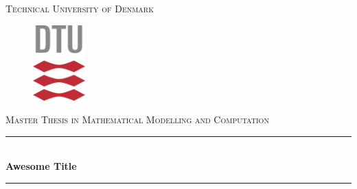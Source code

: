\begin{titlepage}

\newcommand{\HRule}{\rule{\linewidth}{0.5mm}} %

\center %
 



\textsc{\LARGE Technical University of Denmark}\\[0.5cm] %

\begin{figure}[h]
\begin{center}
\includegraphics[width=2cm]{Pics/frontpage/dtu_logo.png}
\end{center}
\end{figure}

\textsc{\Large Master Thesis in Mathematical Modelling and Computation}\\[0.5cm] %


\HRule \\[0.4cm]
{ \huge \bfseries Awesome Title}\\[0.4cm] %
\HRule\\ [1cm]
 




\end{titlepage}
